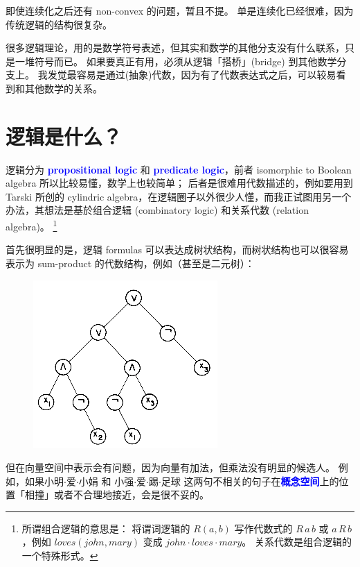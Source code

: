 \documentclass[12pt]{article}
\newcommand{\concept}[1]{\textbf{\textcolor{blue}{#1}}}
\newcommand{\formula}[1]{\textcolor{LogicColor}{#1}}
\begin{document}
即使连续化之后还有 non-convex 的问题，暂且不提。 单是连续化已经很难，因为传统逻辑的结构很复杂。

很多逻辑理论，用的是数学符号表述，但其实和数学的其他分支没有什么联系，只是一堆符号而已。 如果要真正有用，必须从逻辑「搭桥」(bridge) 到其他数学分支上。 我发觉最容易是通过(抽象)代数，因为有了代数表达式之后，可以较易看到和其他数学的关系。

\section{逻辑是什么？}

逻辑分为 \concept{propositional logic} 和 \concept{predicate logic}，前者 isomorphic to Boolean algebra 所以比较易懂，数学上也较简单； 后者是很难用代数描述的，例如要用到 Tarski 所创的 cylindric algebra，在逻辑圈子以外很少人懂，而我正试图用另一个办法，其想法是基於组合逻辑 (combinatory logic) 和关系代数 (relation algebra)。 \footnote{所谓组合逻辑的意思是： 将谓词逻辑的 $R(a, b)$ 写作代数式的 $R \,a\, b$ 或 $a \,R\, b$，例如 $loves(john, mary)$ 变成 $john \cdot loves \cdot mary$。 关系代数是组合逻辑的一个特殊形式。}


首先很明显的是，逻辑 formulas 可以表达成树状结构，而树状结构也可以很容易表示为 sum-product 的代数结构，例如（甚至是二元树）：
\begin{figure}[H]
\centering
\includegraphics[scale=0.5]{logic-formula-tree.jpg}
\end{figure}

但在向量空间中表示会有问题，因为向量有加法，但乘法没有明显的候选人。 例如，如果\formula{小明$\cdot$爱$\cdot$小娟} 和 \formula{小强$\cdot$爱$\cdot$踢$\cdot$足球} 这两句不相关的句子在\concept{概念空间}上的位置「相撞」或者不合理地接近，会是很不妥的。 
\end{document}
